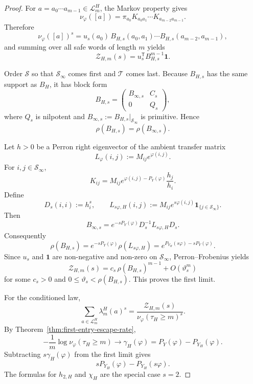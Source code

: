 \begin{proof}
For \(a=a_0\cdots a_{m-1}\in\mathcal L_m^H\), the Markov property gives
\[
  \nu_\varphi([a])
  = \pi_{a_0}K_{a_0a_1}\cdots K_{a_{m-2}a_{m-1}}.
\]
Therefore
\[
  \nu_\varphi([a])^s
  = u_s(a_0)\,
    B_{H,s}(a_0,a_1)\cdots B_{H,s}(a_{m-2},a_{m-1}),
\]
and summing over all safe words of length \(m\) yields
\[
  \mathcal Z_{H,m}(s)=u_s^{\mathsf T}B_{H,s}^{m-1}\mathbf 1.
\]

Order \(\mathcal S\) so that \(\mathcal S_\infty\) comes first and
\(\mathcal T\) comes last.  Because \(B_{H,s}\) has the same support as
\(B_H\), it has block form
\[
  B_{H,s}=
  \begin{pmatrix}
    B_{\infty,s} & C_s\\
    0 & Q_s
  \end{pmatrix},
\]
where \(Q_s\) is nilpotent and \(B_{\infty,s}:=B_{H,s}|_{\mathcal S_\infty}\)
is primitive.  Hence
\[
  \rho(B_{H,s})=\rho(B_{\infty,s}).
\]

Let \(h>0\) be a Perron right eigenvector of the ambient transfer matrix
\[
  L_\varphi(i,j):=M_{ij}e^{\varphi(i,j)}.
\]
For \(i,j\in\mathcal S_\infty\),
\[
  K_{ij}
  = M_{ij}e^{\varphi(i,j)-P_Y(\varphi)}\frac{h_j}{h_i}.
\]
Define
\[
  D_s(i,i):=h_i^s,
  \qquad
  L_{s\varphi,H}(i,j)
  := M_{ij}e^{s\varphi(i,j)}\mathbf 1_{\{j\in\mathcal S_\infty\}}.
\]
Then
\[
  B_{\infty,s}
  = e^{-sP_Y(\varphi)}D_s^{-1}L_{s\varphi,H}D_s.
\]
Consequently
\[
  \rho(B_{H,s})
  = e^{-sP_Y(\varphi)}\rho(L_{s\varphi,H})
  = e^{P_{Y_H}(s\varphi)-sP_Y(\varphi)}.
\]
Since \(u_s\) and \(\mathbf 1\) are non-negative and non-zero on
\(\mathcal S_\infty\), Perron--Frobenius yields
\[
  \mathcal Z_{H,m}(s)
  = c_s\,\rho(B_{H,s})^{m-1}+O(\vartheta_s^m)
\]
for some \(c_s>0\) and \(0\leq \vartheta_s<\rho(B_{H,s})\).  This proves
the first limit.

For the conditioned law,
\[
  \sum_{a\in\mathcal L_m^H}\lambda_m^H(a)^s
  = \frac{\mathcal Z_{H,m}(s)}
         {\nu_\varphi(\tau_H\ge m)^s}.
\]
By Theorem~\ref{thm:first-entry-escape-rate},
\[
  -\frac1m\log \nu_\varphi(\tau_H\ge m)\longrightarrow \gamma_H(\varphi)
  = P_Y(\varphi)-P_{Y_H}(\varphi).
\]
Subtracting \(s\gamma_H(\varphi)\) from the first limit gives
\[
  sP_{Y_H}(\varphi)-P_{Y_H}(s\varphi).
\]
The formulas for \(h_{2,H}\) and \(\chi_H\) are the special case
\(s=2\).
\end{proof}

